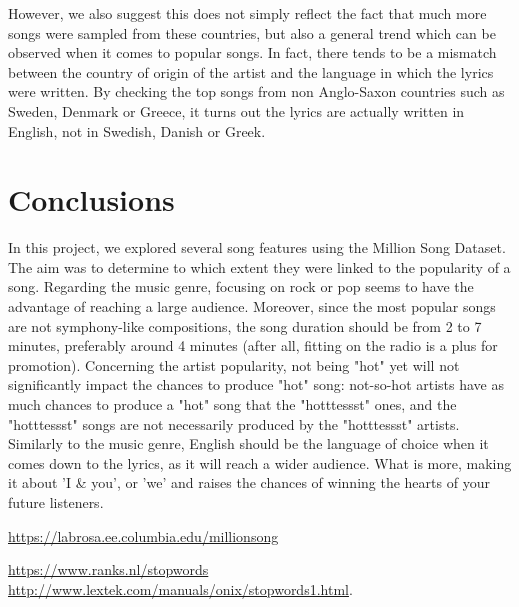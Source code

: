 \documentclass[11pt]{article}
\renewcommand\_{\textunderscore\allowbreak}
\begin{document}
However, we also suggest this does not simply reflect the fact that much more songs were sampled from these countries, but also a general trend which can be observed when it comes to popular songs.
In fact, there tends to be a mismatch between the country of origin of the artist and the language in which the lyrics were written.
By checking the top songs from non Anglo-Saxon countries such as Sweden, Denmark or Greece, it turns out the lyrics are actually written in English, not in Swedish, Danish or Greek.


	
\section{Conclusions}
In this project, we explored several song features using the Million Song Dataset. The aim was to determine to which extent they were linked to the popularity of a song.
Regarding the music genre, focusing on rock or pop seems to have the advantage of reaching a large audience.
Moreover, since the most popular songs are not symphony-like compositions, the song duration should be from 2 to 7 minutes, preferably around 4 minutes (after all, fitting on the radio is a plus for promotion).
Concerning the artist popularity, not being "hot" yet will not significantly impact the chances to produce "hot" song: not-so-hot artists have as much chances to produce a "hot" song that the "hotttessst" ones, and the "hotttessst" songs are not necessarily produced by the "hotttessst" artists.
Similarly to the music genre, English should be the language of choice when it comes down to the lyrics, as it will reach a wider audience. What is more, making it about 'I \& you', or 'we' and raises the chances of winning the hearts of your future listeners.


\begin{thebibliography}{}

\url{https://labrosa.ee.columbia.edu/millionsong}

\url{https://www.ranks.nl/stopwords}\\
\url{http://www.lextek.com/manuals/onix/stopwords1.html}.


\end{thebibliography}
\end{document}
